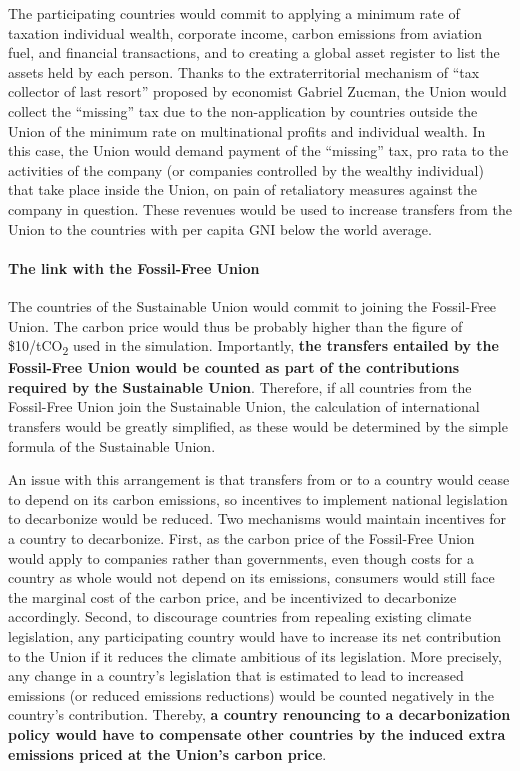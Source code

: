 \documentclass[12pt,english]{article}
\begin{document}
The participating countries would commit to applying a minimum rate of taxation individual wealth, corporate income, carbon emissions from aviation fuel, and financial transactions, and to creating a global asset register to list the assets held by each person. 
Thanks to the extraterritorial mechanism of ``tax collector of last resort'' proposed by economist Gabriel Zucman,\cite{zucman_blueprint_2024} the Union would collect the ``missing'' tax due to the non-application by countries outside the Union of the minimum rate on multinational profits and individual wealth. In this case, the Union would demand payment of the ``missing'' tax, pro rata to the activities of the company (or companies controlled by the wealthy individual) that take place inside the Union, on pain of retaliatory measures against the company in question. These revenues would be used to increase transfers from the Union to the countries with per capita GNI below the world average. 

\paragraph{The link with the Fossil-Free Union}
The countries of the Sustainable Union would commit to joining the Fossil-Free Union. The carbon price would thus be probably higher than the figure of \$10/tCO\textsubscript{2} used in the simulation. Importantly, \textbf{the transfers entailed by the Fossil-Free Union would be counted as part of the contributions required by the Sustainable Union}. Therefore, if all countries from the Fossil-Free Union join the Sustainable Union, the calculation of international transfers would be greatly simplified, as these would be determined by the simple formula of the Sustainable Union. 

An issue with this arrangement is that transfers from or to a country would cease to depend on its carbon emissions, so incentives to implement national legislation to decarbonize would be reduced. Two mechanisms would maintain incentives for a country to decarbonize. First, as the carbon price of the Fossil-Free Union would apply to companies rather than governments, even though costs for a country as whole would not depend on its emissions, consumers would still face the marginal cost of the carbon price, and be incentivized to decarbonize accordingly. Second, to discourage countries from repealing existing climate legislation, any participating country would have to increase its net contribution to the Union if it reduces the climate ambitious of its legislation. More precisely, any change in a country's legislation that is estimated to lead to increased emissions (or reduced emissions reductions) would be counted negatively in the country's contribution. Thereby, \textbf{a country renouncing to a decarbonization policy would have to compensate other countries by the induced extra emissions priced at the Union's carbon price}.
\end{document}
